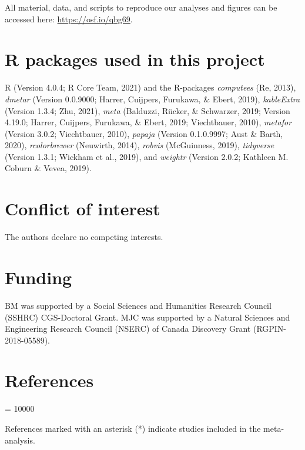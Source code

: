 \documentclass[
  english,
  man,floatsintext]{apa7}
\begin{document}
\label{sec:sharing}
All material, data, and scripts to reproduce our analyses and figures can be accessed here: \url{https://osf.io/qbg69}.

\hypertarget{r-packages-used-in-this-project}{%
\section{R packages used in this project}\label{r-packages-used-in-this-project}}

R (Version 4.0.4; R Core Team, 2021) and the R-packages \emph{computees} (Re, 2013), \emph{dmetar} (Version 0.0.9000; Harrer, Cuijpers, Furukawa, \& Ebert, 2019), \emph{kableExtra} (Version 1.3.4; Zhu, 2021), \emph{meta} (Balduzzi, Rücker, \& Schwarzer, 2019; Version 4.19.0; Harrer, Cuijpers, Furukawa, \& Ebert, 2019; Viechtbauer, 2010), \emph{metafor} (Version 3.0.2; Viechtbauer, 2010), \emph{papaja} (Version 0.1.0.9997; Aust \& Barth, 2020), \emph{rcolorbrewer} (Neuwirth, 2014), \emph{robvis} (McGuinness, 2019), \emph{tidyverse} (Version 1.3.1; Wickham et al., 2019), and \emph{weightr} (Version 2.0.2; Kathleen M. Coburn \& Vevea, 2019).

\hypertarget{conflict-of-interest}{%
\section{Conflict of interest}\label{conflict-of-interest}}

The authors declare no competing interests.

\hypertarget{funding}{%
\section{Funding}\label{funding}}

BM was supported by a Social Sciences and Humanities Research Council (SSHRC) CGS-Doctoral Grant. MJC was supported by a Natural Sciences and Engineering Research Council (NSERC) of Canada Discovery Grant (RGPIN-2018-05589).

\hypertarget{references}{%
\section{References}\label{references}}

\begingroup
\interlinepenalty = 10000
\setlength{\parindent}{-0.5in}
\setlength{\leftskip}{0.5in}

References marked with an asterisk (*) indicate studies included in the meta-analysis.
\end{document}
